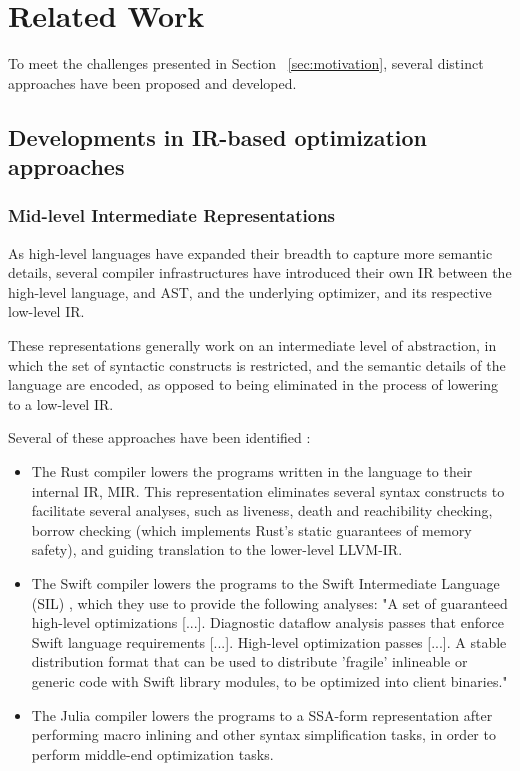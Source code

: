 \chapter{Related Work}\label{chap:sota-lit}

To meet the challenges presented in Section ~\ref{sec:motivation}, several distinct approaches have been proposed and developed.

\section{Developments in IR-based optimization approaches}

\subsection{Mid-level Intermediate Representations}\label{sec:midlevel-ir}

As high-level languages have expanded their breadth to capture more semantic details, several compiler infrastructures have introduced their own IR between the high-level language, and AST, and the underlying optimizer, and its respective low-level IR.

These representations generally work on an intermediate level of abstraction, in which the set of syntactic constructs is restricted, and the semantic details of the language are encoded, as opposed to being eliminated in the process of lowering to a low-level IR.

Several of these approaches have been identified \cite{Lattner2021}:

\begin{itemize}
    \item The Rust compiler lowers the programs written in the language to their internal IR, MIR\cite{RustMirRfc}. This representation eliminates several syntax constructs to facilitate several analyses, such as liveness, death and reachibility checking, borrow checking (which implements Rust's static guarantees of memory safety), and guiding translation to the lower-level LLVM-IR.
    \item The Swift compiler lowers the programs to the Swift Intermediate Language (SIL) \cite{SwiftSIL}, which they use to provide the following analyses: "A set of guaranteed high-level optimizations [...]. Diagnostic dataflow analysis passes that enforce Swift language requirements [...]. High-level optimization passes [...]. A stable distribution format that can be used to distribute 'fragile' inlineable or generic code with Swift library modules, to be optimized into client binaries."
    \item The Julia compiler lowers the programs to a SSA-form representation \cite{JuliaIR} after performing macro inlining and other syntax simplification tasks, in order to perform middle-end optimization tasks.
\end{itemize}

